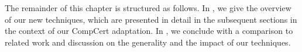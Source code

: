 
The remainder of this chapter is structured as follows.  In , we give the
overview of our new techniques, which are presented in detail in the subsequent sections in the
context of our CompCert adaptation.  In , we conclude with a comparison
to related work and discussion on the generality and the impact of our techniques.
















